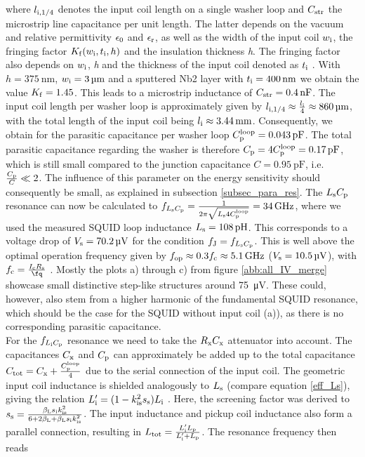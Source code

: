 where $l_{\rm i,1/4}$ denotes the input coil length on a single washer loop and $C_{\rm str}$
the microstrip line capacitance per unit length. The latter depends on the vacuum and relative permittivity $\epsilon_{\rm 0}$ and $\epsilon_{\rm r}$, as well as the width of the input coil $w_{\rm i}$, the fringing factor $K_{\rm f}(w_{\rm i},t_{\rm i},h)$ and the insulation thickness \textit{h}. The fringing factor also depends on $w_{\rm i}$, \textit{h} and the thickness of the input coil denoted as $t_{\rm i}$ \cite{Chang1979}. With $h=\qty{375}{\nm}$, $w_{\rm i}=\qty{3}{\um}$ and a sputtered Nb2 layer with $t_{\rm i}=\qty{400}{\nm}$ we obtain the value $K_{\rm f}=1.45$. This leads to a microstrip inductance of $C_{\rm str}=\qty{0.4}{\nF}$. The input coil length per washer loop is approximately given by $l_{\rm i,1/4}\approx\frac{l_{\rm i}}{4}\approx\qty{860}{\um}$, with the total length of the input coil being $l_{\rm i}\approx\qty{3.44}{\mm}$. Consequently, we obtain for the parasitic capacitance per washer loop $C_{\rm p}^{\rm loop}=\qty{0.043}{\pF}$. The total parasitic capacitance regarding the washer is therefore $C_{\rm p}=4C_{\rm p}^{\rm loop}=\qty{0.17}{\pF}$, which is still small compared to the junction capacitance $C=\qty{0.95}{\pF}$, i.e. $\frac{C_{\rm p}}{C}\ll 2$. The influence of this parameter on the energy sensitivity should consequently be small, as explained in subsection \ref{subsec_para_res}. The $L_{\rm s}C_{\rm p}$ resonance can now be calculated to $f_{L_{\rm s}C_{\rm p}}=\frac{1}{2\pi\sqrt{L_{\rm s}4C_{\rm p}^{\rm loop}}}=\qty{34}{\GHz}$, where we used the measured SQUID loop inductance $L_{\rm s}=\qty{108}{\pH}$. This corresponds to a voltage drop of $V_{\rm s}=\qty{70.2}{\uV}$ for the condition $f_{\rm J}=f_{L_{\rm s}C_{\rm p}}$. This is well above the optimal operation frequency given by $f_{\rm op}\approx 0.3f_{\rm c}\approx\qty{5.1}{\GHz}$ ($V_{\rm s}=\qty{10.5}{\uV}$), with $f_{\rm c}=\frac{I_{\rm c}R_{\rm s}}{\unit{\fq}}$ \cite{Cantor1996}. Mostly the plots a) through c) from figure \ref{abb:all_IV_merge} showcase small distinctive step-like structures around \qty{75}{\uV}. These could, however, also stem from a higher harmonic of the fundamental SQUID resonance, which should be the case for the SQUID without input coil (a)), as there is no corresponding parasitic capacitance. \\

For the $f_{L_{\rm i}C_{\rm p}}$ resonance we need to take the $R_{\rm x}C_{\rm x}$ attenuator into account. The capacitances $C_{\rm x}$ and $C_{\rm p}$ can approximately be added up to the total capacitance $C_{\rm tot}=C_{\rm x}+\frac{C_{\rm p}^{\rm loop}}{4}$ due to the serial connection of the input coil. The geometric input coil inductance is shielded analogously to $L_{\rm s}$ (compare equation \ref{eff_Ls}), giving the relation $L_{\rm i}'=(1-k_{\rm is}^2s_{\rm s})L_{\rm i}$ \cite{Cantor1996}. Here, the screening factor was derived to $s_{\rm s}=\frac{\beta_{\rm L}s_{\rm i}k_{\rm is}^2}{6+2\beta_{\rm L}+\beta_{\rm L}s_{\rm i}k_{\rm is}^2}$. The input inductance and pickup coil inductance also form a parallel connection, resulting in $L_{\rm tot}=\frac{L_{\rm i}'L_{\rm p}}{L_{\rm i}'+L_{\rm p}}$. The resonance frequency then reads 

